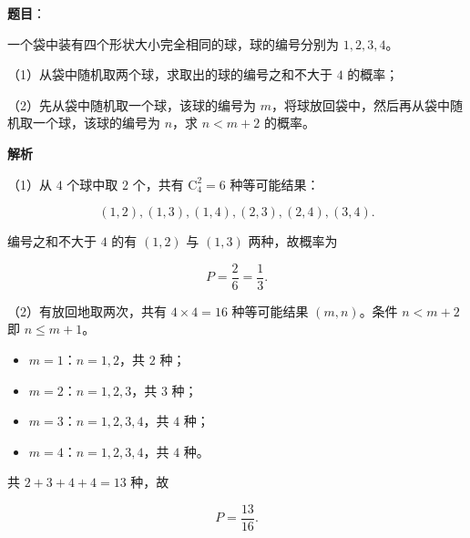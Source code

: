 \begin{answer}

\textbf{题目}：

一个袋中装有四个形状大小完全相同的球，球的编号分别为 $1,2,3,4$。

（1）从袋中随机取两个球，求取出的球的编号之和不大于 $4$ 的概率；

（2）先从袋中随机取一个球，该球的编号为 $m$，将球放回袋中，然后再从袋中随机取一个球，该球的编号为 $n$，求 $n<m+2$ 的概率。

\textbf{解析}

（1）从 $4$ 个球中取 $2$ 个，共有 $\mathrm C_4^2=6$ 种等可能结果：

\nopagebreak[4]
\[(1,2),(1,3),(1,4),(2,3),(2,4),(3,4).\]

编号之和不大于 $4$ 的有 $(1,2)$ 与 $(1,3)$ 两种，故概率为

\nopagebreak[4]
\[P=\frac26=\frac13.\]

（2）有放回地取两次，共有 $4\times4=16$ 种等可能结果 $(m,n)$。条件 $n<m+2$ 即 $n\leqslant m+1$。

\begin{itemize}
\item $m=1$：$n=1,2$，共 $2$ 种；
\item $m=2$：$n=1,2,3$，共 $3$ 种；
\item $m=3$：$n=1,2,3,4$，共 $4$ 种；
\item $m=4$：$n=1,2,3,4$，共 $4$ 种。
\end{itemize}

共 $2+3+4+4=13$ 种，故

\nopagebreak[4]
\[P=\frac{13}{16}.\]


\end{answer}

